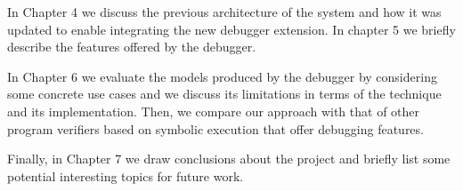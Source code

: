 In Chapter 4 we discuss the previous architecture of the system and how it was
updated to enable integrating the new debugger extension. In chapter 5 we
briefly describe the features offered by the debugger.

In Chapter 6 we evaluate the models produced by the debugger by considering some
concrete use cases and we discuss its limitations in terms of the technique and
its implementation. Then, we compare our approach with that of other program
verifiers based on symbolic execution that offer debugging features.

Finally, in Chapter 7 we draw conclusions about the project and briefly list
some potential interesting topics for future work.

